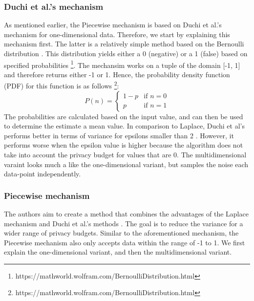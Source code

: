 \subsubsection{Duchi et al.'s mechanism}
As mentioned earlier, the Piecewise mechanism is based on Duchi et al.'s mechanism for one-dimensional data.
Therefore, we start by explaining this mechanism first.
The latter is a relatively simple method based on the Bernoulli distribution \citep{duchi_minimax_2017}.
This distribution yields either a 0 (negative) or a 1 (false) based on specified probabilities \footnote{https://mathworld.wolfram.com/BernoulliDistribution.html}.
The mechansim works on a tuple of the domain [-1, 1] and therefore returns either -1 or 1.
Hence, the probability density function (PDF) for this function is as follows \footnote{https://mathworld.wolfram.com/BernoulliDistribution.html}:
\begin{equation}
    P(n) =
    \begin{cases}
        1 - p & \text{if } n = 0 \\
        p     & \text{if } n = 1
    \end{cases}
\end{equation}
The probabilities are calculated based on the input value, and can then be used to determine the estimate a mean value.
In comparison to Laplace, Duchi et al's performs better in terms of variance for epsilons smaller than 2 \citep{wang_collecting_2019}.
However, it performs worse when the epsilon value is higher because the algorithm does not take into account the privacy budget for values that are 0.
The multidimensional varaint looks much a like the one-dimensional variant, but samples the noise each data-point independently.

\subsubsection*{Piecewise mechanism}
The authors aim to create a method that combines the advantages of the Laplace mechanism and Duchi et al.'s methods \citep{wang_collecting_2019}.
The goal is to reduce the variance for a wider range of privacy budgets.
Similar to the aforementioned mechanism, the Piecewise mechanism also only accepts data within the range of -1 to 1.
We first explain the one-dimensional variant, and then the multidimensional variant.


